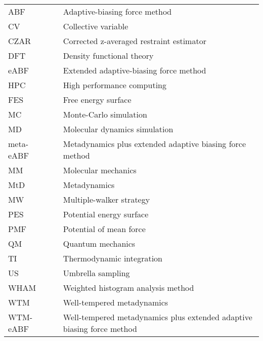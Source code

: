\label{cha:symbols}

\begin{longtable}[l]{lcp{10cm}}
	ABF		&&  Adaptive-biasing force method \\
	CV    &&  Collective variable \\
	CZAR  &&  Corrected z-averaged restraint estimator \\
	DFT   &&  Density functional theory \\
	eABF  &&  Extended adaptive-biasing force method \\
	HPC   &&  High performance computing \\
	FES   &&  Free energy surface \\
	MC    &&  Monte-Carlo simulation \\
	MD    &&  Molecular dynamics simulation \\
	meta-eABF && Metadynamics plus extended adaptive biasing force method \\
	MM    &&  Molecular mechanics \\
	MtD   &&  Metadynamics \\
	MW    &&  Multiple-walker strategy \\
	PES   &&  Potential energy surface \\
	PMF   &&  Potential of mean force \\
	QM    &&  Quantum mechanics \\
	TI    &&  Thermodynamic integration \\
  US    &&  Umbrella sampling \\
	WHAM  &&  Weighted histogram analysis method \\
	WTM   &&  Well-tempered metadynamics \\
	WTM-eABF && Well-tempered metadynamics plus extended adaptive biasing force method \\
\end{longtable}
